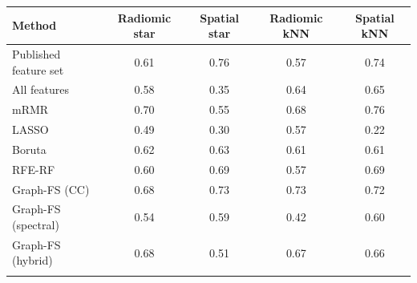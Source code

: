 \begin{tabular}{@{}lcccc@{}}
\toprule
Method & Radiomic star & Spatial star & Radiomic kNN & Spatial kNN \\
\midrule
Published feature set & 0.61 & 0.76 & 0.57 & 0.74 \\
All features & 0.58 & 0.35 & 0.64 & 0.65 \\
mRMR & 0.70 & 0.55 & 0.68 & 0.76 \\
LASSO & 0.49 & 0.30 & 0.57 & 0.22 \\
Boruta & 0.62 & 0.63 & 0.61 & 0.61 \\
RFE-RF & 0.60 & 0.69 & 0.57 & 0.69 \\
Graph-FS (CC) & 0.68 & 0.73 & 0.73 & 0.72 \\
Graph-FS (spectral) & 0.54 & 0.59 & 0.42 & 0.60 \\
Graph-FS (hybrid) & 0.68 & 0.51 & 0.67 & 0.66 \\
\botrule
\end{tabular}
